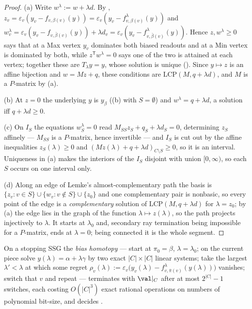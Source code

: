 \begin{proof}
(a) Write $w^{\lambda}:=w+\lambda d$. By ,
$z_v=\varepsilon_v(y_v-f_{v,\beta(v)}(y))=
\varepsilon_v(y_v-f^{\lambda}_{v,\beta(v)}(y))$ and
$w^{\lambda}_v=\varepsilon_v(y_v-f_{v,\bar\beta(v)}(y))+\lambda d_v
=\varepsilon_v(y_v-f^{\lambda}_{v,\bar\beta(v)}(y))$. Hence
$z,w^\lambda\ge0$ says that at a Max vertex $y_v$ dominates both biased
readouts and at a Min vertex is dominated by both, while
$z^{\mathsf T}w^{\lambda}=0$ says one of the two is attained at each vertex;
together these are $T_\lambda y=y$, whose solution is unique
(). Since $y\mapsto z$ is an affine bijection and
$w=Mz+q$, these conditions are $\mathrm{LCP}(M,q+\lambda d)$, and $M$ is a
$P$-matrix by (a).

(b) At $z=0$ the underlying $y$ is $y_\beta$ ((b) with
$S=\emptyset$) and $w^{\lambda}=q+\lambda d$, a solution iff
$q+\lambda d\ge0$.

(c) On $I_S$ the equations $w^{\lambda}_S=0$ read
$M_{SS}z_S+q_S+\lambda d_S=0$, determining $z_S$ affinely --- $M_{SS}$ is a
$P$-matrix, hence invertible --- and $I_S$ is cut out by the affine
inequalities $z_S(\lambda)\ge0$ and
$(Mz(\lambda)+q+\lambda d)_{C\setminus S}\ge0$, so it is an interval.
Uniqueness in (a) makes the interiors of the $I_S$ disjoint with union
$[0,\infty)$, so each $S$ occurs on one interval only.

(d) Along an edge of Lemke's almost-complementary path the basis is
$\{z_v:v\in S\}\cup\{w_v:v\notin S\}\cup\{z_0\}$ and one complementary pair
is nonbasic, so every point of the edge is a \emph{complementary} solution of
$\mathrm{LCP}(M,q+\lambda d)$ for $\lambda=z_0$; by (a) the edge lies in the
graph of the function $\lambda\mapsto z(\lambda)$, so the path projects
injectively to $\lambda$. It starts at $\lambda_0$ and, secondary ray
termination being impossible for a $P$-matrix, ends at $\lambda=0$; being
connected it is the whole segment.
\end{proof}

\begin{corollary}\label{fsa:algorithm}
On a stopping SSG the \emph{bias homotopy} --- start at $\pi_0=\beta$,
$\lambda=\lambda_0$; on the current piece solve
$y(\lambda)=\alpha+\lambda\gamma$ by two exact $|C|\times|C|$ linear systems;
take the largest $\lambda'<\lambda$ at which some regret
$\rho_v(\lambda):=\varepsilon_v\bigl(y_v(\lambda)-
f^{\lambda}_{v,\bar\pi(v)}(y(\lambda))\bigr)$ vanishes; switch that $v$ and
repeat --- terminates with $\val|_C$ after at most $2^{|C|}-1$ switches, each
costing $O(|C|^{3})$ exact rational operations on numbers of polynomial
bit-size, and decides .
\end{corollary}

